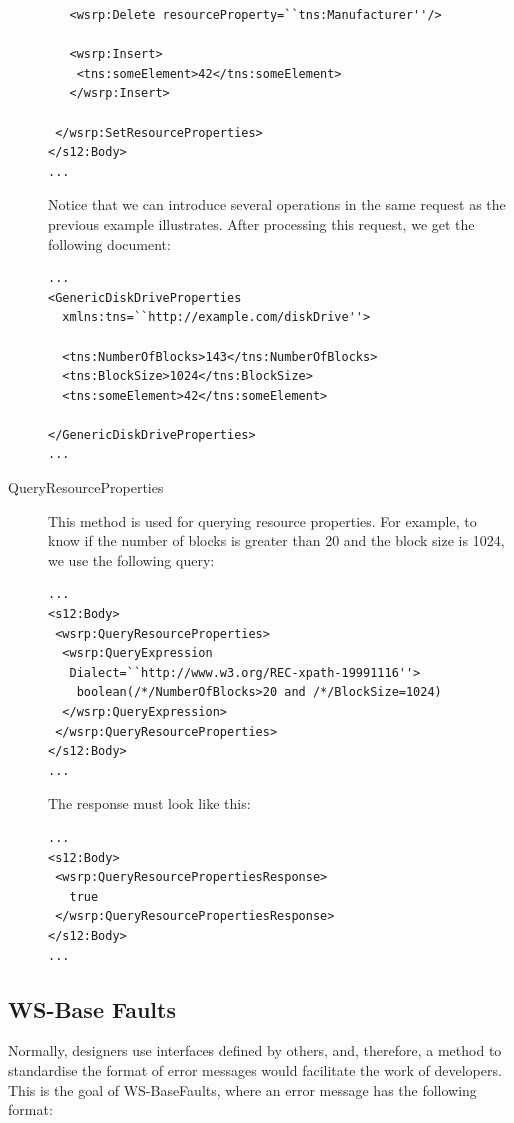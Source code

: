 \begin{description}
\begin{lstlisting}
   <wsrp:Delete resourceProperty=``tns:Manufacturer''/>

   <wsrp:Insert>
    <tns:someElement>42</tns:someElement>
   </wsrp:Insert>

 </wsrp:SetResourceProperties>
</s12:Body>
...
\end{lstlisting}

Notice that we can introduce several operations in the same request as the previous example illustrates. 
After processing this request, we get the following document:

\begin{lstlisting}
...
<GenericDiskDriveProperties
  xmlns:tns=``http://example.com/diskDrive''>
  
  <tns:NumberOfBlocks>143</tns:NumberOfBlocks>
  <tns:BlockSize>1024</tns:BlockSize>
  <tns:someElement>42</tns:someElement>

</GenericDiskDriveProperties>
...
\end{lstlisting}

\item[QueryResourceProperties]
This method is used for querying resource properties. 
For example, to know if the number of blocks is greater than 20 and the block size is 1024,
we use the following query: \\

\begin{lstlisting}
...
<s12:Body>
 <wsrp:QueryResourceProperties>
  <wsrp:QueryExpression
   Dialect=``http://www.w3.org/REC-xpath-19991116''>
    boolean(/*/NumberOfBlocks>20 and /*/BlockSize=1024)
  </wsrp:QueryExpression>
 </wsrp:QueryResourceProperties>
</s12:Body>
...
\end{lstlisting}
\newpage

The response must look like this:

\begin{lstlisting}
...
<s12:Body>
 <wsrp:QueryResourcePropertiesResponse>
   true
 </wsrp:QueryResourcePropertiesResponse>
</s12:Body>
...
\end{lstlisting}

\end{description}

\subsection*{WS-Base Faults}
Normally, designers use interfaces defined by others, and, therefore,
a method to standardise the format of error messages would facilitate the work of developers. 
This is the goal of WS-BaseFaults, where an error message has the following format:

